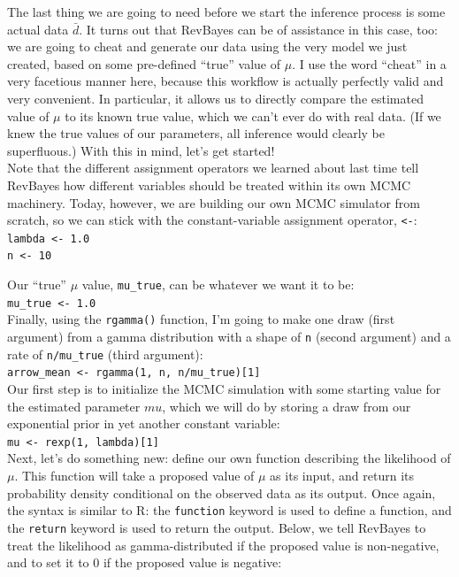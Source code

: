 \documentclass[12pt]{article}
\begin{document}
\noindent The last thing we are going to need before we start the inference process is some actual data $\bar{d}$. It turns out that RevBayes can be of assistance in this case, too: we are going to cheat and generate our data using the very model we just created, based on some pre-defined ``true'' value of $\mu$. I use the word ``cheat'' in a very facetious manner here, because this workflow is actually perfectly valid and very convenient. In particular, it allows us to directly compare the estimated value of $\mu$ to its known true value, which we can't ever do with real data. (If we knew the true values of our parameters, all inference would clearly be superfluous.) With this in mind, let's get started! \\

\noindent Note that the different assignment operators we learned about last time tell RevBayes how different variables should be treated within its own MCMC machinery. Today, however, we are building our own MCMC simulator from scratch, so we can stick with the constant-variable assignment operator, \texttt{<-}: \\

\indent \texttt{lambda <- 1.0} \\
\indent \texttt{n <- 10}

\newpage

\noindent Our ``true'' $\mu$ value, \texttt{mu\_true}, can be whatever we want it to be: \\

\indent \texttt{mu\_true <- 1.0} \\

\noindent Finally, using the \texttt{rgamma()} function, I'm going to make one draw (first argument) from a gamma distribution with a shape of \texttt{n} (second argument) and a rate of \texttt{n/mu\_true} (third argument): \\

\indent \texttt{arrow\_mean <- rgamma(1, n, n/mu\_true)[1]} \\

\noindent Our first step is to initialize the MCMC simulation with some starting value for the estimated parameter $mu$, which we will do by storing a draw from our exponential prior in yet another constant variable: \\

\indent \texttt{mu <- rexp(1, lambda)[1]} \\

\noindent Next, let's do something new: define our own function describing the likelihood of $\mu$. This function will take a proposed value of $\mu$ as its input, and return its probability density conditional on the observed data as its output. Once again, the syntax is similar to \textsf{R}: the \texttt{function} keyword is used to define a function, and the \texttt{return} keyword is used to return the output. Below, we tell RevBayes to treat the likelihood as gamma-distributed if the proposed value is non-negative, and to set it to 0 if the proposed value is negative: \\
\end{document}
